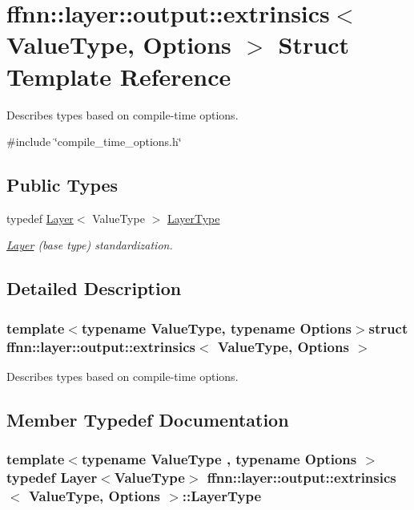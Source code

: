 \hypertarget{structffnn_1_1layer_1_1output_1_1extrinsics}{\section{ffnn\-:\-:layer\-:\-:output\-:\-:extrinsics$<$ Value\-Type, Options $>$ Struct Template Reference}
\label{structffnn_1_1layer_1_1output_1_1extrinsics}
}


Describes types based on compile-\/time options.  




{\ttfamily \#include \char`\"{}compile\-\_\-time\-\_\-options.\-h\char`\"{}}

\subsection*{Public Types}
\begin{DoxyCompactItemize}
\item 
typedef \hyperlink{classffnn_1_1layer_1_1_layer}{Layer}$<$ Value\-Type $>$ \hyperlink{structffnn_1_1layer_1_1output_1_1extrinsics_aa75ee824ba5e8fe17aaf589d9ef8d4c5}{Layer\-Type}
\begin{DoxyCompactList}\small\item\em \hyperlink{classffnn_1_1layer_1_1_layer}{Layer} (base type) standardization. \end{DoxyCompactList}\end{DoxyCompactItemize}


\subsection{Detailed Description}
\subsubsection*{template$<$typename Value\-Type, typename Options$>$struct ffnn\-::layer\-::output\-::extrinsics$<$ Value\-Type, Options $>$}

Describes types based on compile-\/time options. 

\subsection{Member Typedef Documentation}
\hypertarget{structffnn_1_1layer_1_1output_1_1extrinsics_aa75ee824ba5e8fe17aaf589d9ef8d4c5}{
\subsubsection[{Layer\-Type}]{\setlength{\rightskip}{0pt plus 5cm}template$<$typename Value\-Type , typename Options $>$ typedef {\bf Layer}$<$Value\-Type$>$ {\bf ffnn\-::layer\-::output\-::extrinsics}$<$ Value\-Type, Options $>$\-::{\bf Layer\-Type}}}\label{structffnn_1_1layer_1_1output_1_1extrinsics_aa75ee824ba5e8fe17aaf589d9ef8d4c5}


